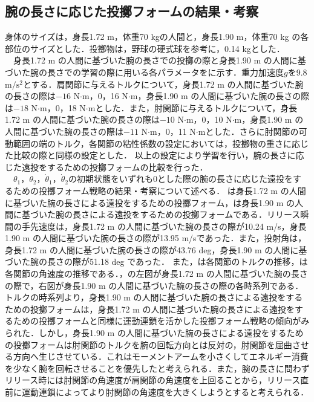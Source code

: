 \begin{small}
\subsection{腕の長さに応じた投擲フォームの結果・考察}
身体のサイズは，身長1.72 m，体重70 kgの人間と，身長1.90 m，体重70 kg の各部位のサイズとした．投擲物は，野球の硬式球を参考に，0.14 kgとした．\\
　身長1.72 m の人間に基づいた腕の長さでの投擲の際と身長1.90 m の人間に基づいた腕の長さでの学習の際に用いる各パラメータをに示す．重力加速度$g$を9.8 $\mathrm{m/s^{2}}$とする．肩関節に与えるトルクについて，身長1.72 m の人間に基づいた腕の長さの際は$-16$ N$\cdot$m，0，16 N$\cdot$m，身長1.90 m の人間に基づいた腕の長さの際は$-18$ N$\cdot$m，0，18 N$\cdot$mとした．また，肘関節に与えるトルクについて，身長1.72 m の人間に基づいた腕の長さの際は$-10$ N$\cdot$m，0，10 N$\cdot$m，身長1.90 m の人間に基づいた腕の長さの際は$-11$ N$\cdot$m，0，11 N$\cdot$mとした．さらに肘関節の可動範囲の端のトルク，各関節の粘性係数の設定においては，投擲物の重さに応じた比較の際と同様の設定とした．
以上の設定により学習を行い，腕の長さに応じた遠投をするための投擲フォームの比較を行った．\\
　$\theta_{1}$，$\theta_{2}$，$\dot{\theta}_{1}$，$\dot{\theta}_{2}$の初期状態をいずれも0とした際の腕の長さに応じた遠投をするための投擲フォーム戦略の結果・考察について述べる．
は身長1.72 m の人間に基づいた腕の長さによる遠投をするための投擲フォーム，は身長1.90 m の人間に基づいた腕の長さによる遠投をするための投擲フォームである．リリース瞬間の手先速度は，身長1.72 m の人間に基づいた腕の長さの際が10.24 m/s，身長1.90 m の人間に基づいた腕の長さの際が13.95 m/sであった．また，投射角は，身長1.72 m の人間に基づいた腕の長さの際が43.76 deg，身長1.90 m の人間に基づいた腕の長さの際が51.18 deg であった．
また，は各関節のトルクの推移，は各関節の角速度の推移である．，の左図が身長1.72 m の人間に基づいた腕の長さの際で，右図が身長1.90 m の人間に基づいた腕の長さの際の各時系列である．トルクの時系列より，身長1.90 m の人間に基づいた腕の長さによる遠投をするための投擲フォームは，身長1.72 m の人間に基づいた腕の長さによる遠投をするための投擲フォームと同様に運動連鎖を活かした投擲フォーム戦略の傾向がみられた．しかし，身長1.90 m の人間に基づいた腕の長さによる遠投をするための投擲フォームは肘関節のトルクを腕の回転方向とは反対の，肘関節を屈曲させる方向へ生じさせている．これはモーメントアームを小さくしてエネルギー消費を少なく腕を回転させることを優先したと考えられる．また，腕の長さに問わずリリース時には肘関節の角速度が肩関節の角速度を上回ることから，リリース直前に運動連鎖によってより肘関節の角速度を大きくしようとすると考えられる．

\end{small}
